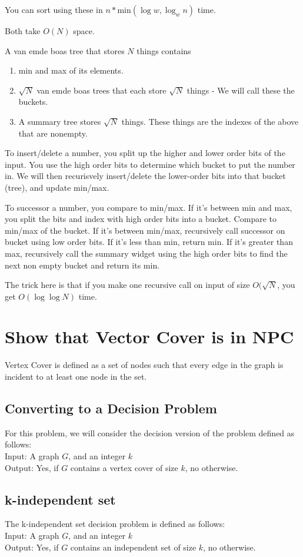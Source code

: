 \documentclass[9pt,twocolumn]{article}
\begin{document}
You can sort using these in $n * $min$(\log w, \log_{w}{n})$ time.

Both take $O(N)$ space.

A van emde boas tree that stores $N$ things contains
\begin{enumerate}
    \item min and max of its elements.
    \item $\sqrt{N}$ van emde boas trees that each store $\sqrt{N}$ things - We will call these the buckets.
    \item A summary tree stores $\sqrt{N}$ things. These things are the indexes of the above that are nonempty.
\end{enumerate}

To insert/delete a number, you split up the higher and lower order bits of the input. You use the high order bits to determine which bucket to put the number in. We will then recurisvely insert/delete the lower-order bits into that bucket (tree), and update min/max.

To successor a number, you compare to min/max. If it's between min and max, you split the bits and index with high order bits into a bucket. Compare to min/max of the bucket. If it's between min/max, recursively call successor on bucket using low order bits. If it's less than min, return min. If it's greater than max, recursively call the summary widget using the high order bits to find the next non empty bucket and return its min.

The trick here is that if you make one recursive call on input of size $O(\sqrt{N}$, you get $O(\log \log N)$ time.

\section{ Show that Vector Cover is in NPC }
Vertex Cover is defined as a set of nodes such that every edge in the graph is incident to at least one node in the set.
\subsection{Converting to a Decision Problem}
For this problem, we will consider the decision version of the problem defined as follows:\\
Input: A graph $G$, and an integer $k$\\
Output: Yes, if $G$ contains a vertex cover of size $k$, no otherwise.

\subsection{k-independent set}
The k-independent set decision problem is defined as follows:\\
Input: A graph $G$, and an integer $k$\\
Output: Yes, if $G$ contains an independent set of size $k$, no otherwise.\\
\end{document}
